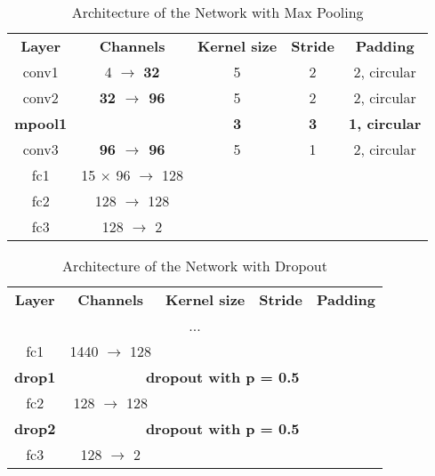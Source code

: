 \begin{table}[htbp]
	\caption{Architecture of the Network with Max Pooling}
	\begin{center}
		\begin{tabular}{|c|c|c|c|c|}
			\hline
			\textbf{Layer}&\textbf{Channels} &\textbf{Kernel size} &\textbf{Stride} &\textbf{Padding}\\
			\cline{1-5}
			conv1  &   4 $\rightarrow$  \bfseries	32 & 5 & 2 & 2, circular \\ \hline
			conv2  & \bfseries 32 $\rightarrow$  	96 & 5 & 2 & 2, circular \\ \hline
			\bfseries mpool1 & 					   & \bfseries 3	& \bfseries 3 & \bfseries 1, circular \\ 
			\hline			
			conv3  & \bfseries 96 $\rightarrow$  	96 & 5 & 1 & 2, circular \\ \hline
			fc1    & 15 $\times$ 96 $\rightarrow$ 128 &  &  &  \\ \hline
			fc2    & 128 $\rightarrow$ 128 &  &  &  \\ \hline
			fc3    & 128 $\rightarrow$   2 &  &  &  \\ \hline
		\end{tabular}
		\label{tab: maxpool}
	\end{center}
\end{table}

\begin{table}[htbp]
	\caption{Architecture of the Network with Dropout}
	\begin{center}
		\begin{tabular}{|c|c|c|c|c|}
			\hline
			\textbf{Layer}&\textbf{Channels} &\textbf{Kernel size} &\textbf{Stride} &\textbf{Padding}\\
			\cline{1-5}
			\multicolumn{5}{|c|}{...} \\ \hline
			fc1 &  1440 $\rightarrow$ 128 &  &  &  \\ \hline
			\bfseries drop1 & \multicolumn{4}{c|}{\bfseries dropout with p = 0.5} \\ \hline
			fc2 &  128 $\rightarrow$ 128 &  &  &  \\ \hline
			\bfseries drop2 & \multicolumn{4}{c|}{\bfseries dropout with p = 0.5} \\ \hline
			fc3 &  128 $\rightarrow$   2 &  &  &  \\ \hline
		\end{tabular}
		\label{tab: dropout}
	\end{center}
\end{table}

